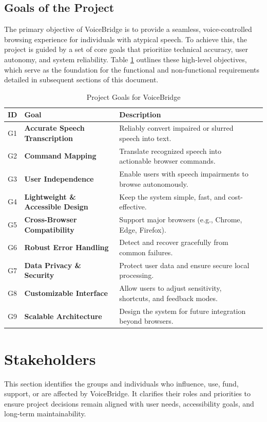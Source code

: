 \documentclass[11pt]{article}
\begin{document}
\subsection{Goals of the Project}
The primary objective of VoiceBridge is to provide a seamless, voice-controlled browsing experience for individuals with atypical speech. To achieve this, the project is guided by a set of core goals that prioritize technical accuracy, user autonomy, and system reliability. Table \ref{tab:project-goals} outlines these high-level objectives, which serve as the foundation for the functional and non-functional requirements detailed in subsequent sections of this document.
\begin{table}[H]
\centering
\setcounter{table}{0}
\begin{tabularx}{\textwidth}{p{1cm}p{4cm}p{8cm}X}
\toprule {\textbf{ID}} & {\textbf{Goal}} & {\textbf{Description}}\\
\midrule
G1 & \textbf{Accurate Speech Transcription} & Reliably convert impaired or slurred speech into text. \\ \hline
G2 & \textbf{Command Mapping} & Translate recognized speech into actionable browser commands. \\ \hline
G3 & \textbf{User Independence} & Enable users with speech impairments to browse autonomously. \\ \hline
G4 & \textbf{Lightweight \& Accessible Design} & Keep the system simple, fast, and cost-effective. \\ \hline
G5 & \textbf{Cross-Browser Compatibility} & Support major browsers (e.g., Chrome, Edge, Firefox). \\ \hline
G6 & \textbf{Robust Error Handling} & Detect and recover gracefully from common failures. \\ \hline
G7 & \textbf{Data Privacy \& Security} & Protect user data and ensure secure local processing. \\ \hline
G8 & \textbf{Customizable Interface} & Allow users to adjust sensitivity, shortcuts, and feedback modes. \\ \hline
G9 & \textbf{Scalable Architecture} & Design the system for future integration beyond browsers. \\ 
\bottomrule
\end{tabularx}
\caption{Project Goals for VoiceBridge}
\label{tab:project-goals}
\end{table}


\section{Stakeholders}
This section identifies the groups and individuals who influence, use, fund, support, or are affected by VoiceBridge. It clarifies their roles and priorities to ensure project decisions remain aligned with user needs, accessibility goals, and long-term maintainability.
\end{document}
